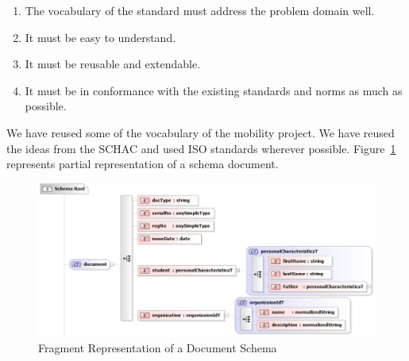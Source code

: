 \documentclass[12pt,a4paper,oneside]{book}
\begin{document}
\begin{enumerate}
\item The vocabulary of the standard must address the problem domain well.
\item It must be easy to understand.
\item It must be reusable and extendable.
\item It must be in conformance with the existing standards and norms as much as possible.
\end{enumerate}

We have reused some of the vocabulary of the mobility project\cite{The Mobility Project}. We have reused the ideas from the SCHAC \cite{SCHAC 1.5.0} and  used ISO standards wherever possible. Figure~\ref{fig:schema_document} represents partial representation of a schema document. 

\begin{figure}[!htp]
  \centering
  \includegraphics[width=14cm]{schema_document.png}
  \caption{Fragment Representation of a Document Schema}
  \label{fig:schema_document}
\end{figure}
\end{document}
